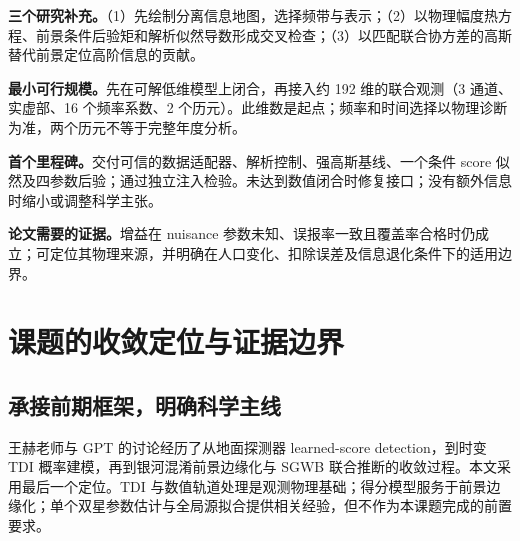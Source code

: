 \documentclass[UTF8,fontset=fandol,a4paper,11pt]{ctexart}
\numberwithin{equation}{section}
\begin{document}
\noindent\textbf{三个研究补充。}（1）先绘制分离信息地图，选择频带与表示；（2）以物理幅度热方程、前景条件后验矩和解析似然导数形成交叉检查；（3）以匹配联合协方差的高斯替代前景定位高阶信息的贡献。

\begin{center}
\end{center}
\noindent\textbf{最小可行规模。}先在可解低维模型上闭合，再接入约 192 维的联合观测（3 通道、实虚部、16 个频率系数、2 个历元）。此维数是起点；频率和时间选择以物理诊断为准，两个历元不等于完整年度分析。

\noindent\textbf{首个里程碑。}交付可信的数据适配器、解析控制、强高斯基线、一个条件 score 似然及四参数后验；通过独立注入检验。未达到数值闭合时修复接口；没有额外信息时缩小或调整科学主张。

\noindent\textbf{论文需要的证据。}增益在 nuisance 参数未知、误报率一致且覆盖率合格时仍成立；可定位其物理来源，并明确在人口变化、扣除误差及信息退化条件下的适用边界。
\clearpage
\begingroup
\small\linespread{1.0}\selectfont
\tableofcontents
\endgroup
\clearpage

\section{课题的收敛定位与证据边界}
\subsection{承接前期框架，明确科学主线}
王赫老师与 GPT 的讨论经历了从地面探测器 learned-score detection，到时变 TDI 概率建模，再到银河混淆前景边缘化与 SGWB 联合推断的收敛过程\cite{discussion}。本文采用最后一个定位。TDI 与数值轨道处理是观测物理基础；得分模型服务于前景边缘化；单个双星参数估计与全局源拟合提供相关经验，但不作为本课题完成的前置要求。
\end{document}
